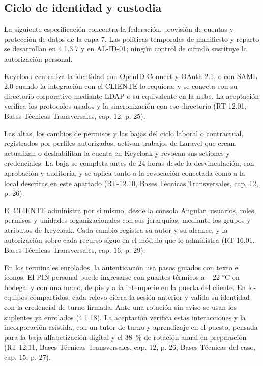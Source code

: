\label{anxR:ciclo-identidad}
\subsection*{Ciclo de identidad y custodia}
La siguiente especificación concentra la federación, provisión de cuentas y protección de datos de la capa 7. Las políticas temporales de manifiesto y reparto se desarrollan en 4.1.3.7 y en AL-ID-01; ningún control de cifrado sustituye la autorización personal.

Keycloak centraliza la identidad con OpenID Connect y OAuth 2.1, o con SAML 2.0 cuando la integración con el CLIENTE lo requiera, y se conecta con su directorio corporativo mediante LDAP o su equivalente en la nube. La aceptación verifica los protocolos usados y la sincronización con ese directorio (RT-12.01, Bases Técnicas Transversales, cap. 12, p. 25).

Las altas, los cambios de permisos y las bajas del ciclo laboral o contractual, registrados por perfiles autorizados, activan trabajos de Laravel que crean, actualizan o deshabilitan la cuenta en Keycloak y revocan sus sesiones y credenciales. La baja se completa antes de 24 horas desde la desvinculación, con aprobación y auditoría, y se aplica tanto a la revocación conectada como a la local descritas en este apartado (RT-12.10, Bases Técnicas Transversales, cap. 12, p. 26).

El CLIENTE administra por sí mismo, desde la consola Angular, usuarios, roles, permisos y unidades organizacionales con sus jerarquías, mediante los grupos y atributos de Keycloak. Cada cambio registra su autor y su alcance, y la autorización sobre cada recurso sigue en el módulo que lo administra (RT-16.01, Bases Técnicas Transversales, cap. 16, p. 29).

En los terminales enrolados, la autenticación usa pasos guiados con texto e iconos. El PIN personal puede ingresarse con guantes térmicos a −22 °C en bodega, y con una mano, de pie y a la intemperie en la puerta del cliente. En los equipos compartidos, cada relevo cierra la sesión anterior y valida su identidad con la credencial de turno firmada. Ante una rotación sin aviso se usan los suplentes ya enrolados (4.1.18). La aceptación verifica estas interacciones y la incorporación asistida, con un tutor de turno y aprendizaje en el puesto, pensada para la baja alfabetización digital y el 38~\% de rotación anual en preparación (RT-12.11, Bases Técnicas Transversales, cap. 12, p. 26; Bases Técnicas del caso, cap. 15, p. 27).

